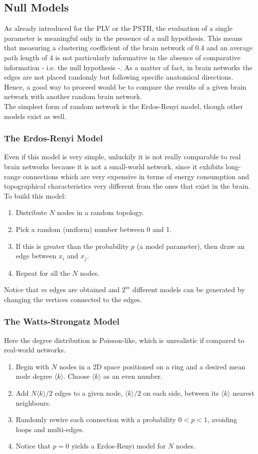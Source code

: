 \subsection{Null Models}
As already introduced for the PLV or the PSTH, the evaluation of a single parameter is meaningful only in the
presence of a null hypothesis. This means that measuring a clustering coefficient of the brain network of 0.4
and an average path length of 4 is not particularly informative in the absence of comparative information - i.e.
the null hypothesis -.
As a matter of fact, in brain networks the edges are not placed randomly but following specific anatomical
directions. Hence, a good way to proceed would be to compare the results of a given brain network with another
random brain network.\\
The simplest form of random network is the Erdos-Renyi model, though other models exist as well.
\subsubsection{The Erdos-Renyi Model}
Even if this model is very simple, unluckily it is not really comparable to real brain networks because
it is not a small-world network, since it exhibits long-range connections which are very expensive in terms
of energy consumption and topographical characteristics very different from the ones that exist in the brain.\\
To build this model:
\begin{enumerate}
    \item Distribute \(N\) nodes in a random topology.
    \item Pick a random (uniform) number between 0 and 1.
    \item If this is greater than the probability \(p\) (a model parameter), then draw an edge between
          \(x_i\) and \(x_j\).
    \item Repeat for all the \(N\) nodes.
\end{enumerate}
Notice that \(m\) edges are obtained and \(2^m\) different models can be generated by changing the
vertices connected to the edges.
\subsubsection{The Watts-Strongatz Model}
Here the degree distribution is Poisson-like, which is unrealistic if compared to real-world networks.
\begin{enumerate}
    \item Begin with \(N\) nodes in a 2D space positioned on a ring and a desired mean node
          degree \(\langle{k}\rangle\). Choose \(\langle{k}\rangle\) as an even number.
    \item Add \(N\langle{k}\rangle/2\) edges to a given node, \(\langle{k}\rangle/2\) on each side,
          between its \(\langle{k}\rangle\) nearest neighbours.
    \item Randomly rewire each connection with a probability \(0<p<1\), avoiding loops and multi-edges.
    \item Notice that \(p=0\) yields a Erdos-Renyi model for \(N\) nodes.
\end{enumerate}
